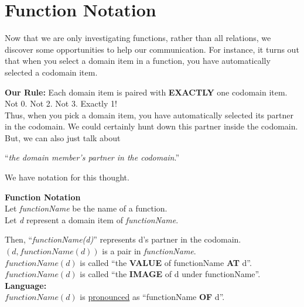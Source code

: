 \documentclass{ximera}
\begin{document}
\section{Function Notation}

Now that we are only investigating functions, rather than all relations, we discover some opportunities to help our communication.  For instance, it turns out that when you select a domain item in a function, you have automatically selected a codomain item.

\textbf{Our Rule:} Each domain item is paired with \textbf{\textcolor{purple!85!blue}{EXACTLY}} one codomain item.  Not 0. Not 2.  Not 3.  Exactly 1!  \\


Thus, when you pick a domain item, you have automatically selected its partner in the codomain.  We could certainly hunt down this partner inside the codomain.  But, we can also just talk about 


\begin{center}
``\textit{the domain member's partner in the codomain}.'' 
\end{center}



We have notation for this thought. \\

\begin{notation} \textbf{\textcolor{green!50!black}{Function Notation}}  \\

Let \textit{functionName} be the name of a function. \\
Let \textit{d} represent a domain item of \textit{functionName}.

Then, ``\textit{functionName(d)}'' represents d's partner in the codomain. \\

$(d, functionName(d))$ is a pair in \textit{functionName}. \\


$functionName(d)$ is called ``the \textbf{\textcolor{purple!85!blue}{VALUE}} of functionName \textbf{\textcolor{purple!85!blue}{AT}} d''. \\
$functionName(d)$ is called ``the \textbf{\textcolor{purple!85!blue}{IMAGE}} of d under functionName''. \\


\textbf{Language:} \\
$functionName(d)$ is \underline{pronounced} as ``functionName \textbf{\textcolor{purple!85!blue}{OF}} d''.
\end{notation}
\end{document}
